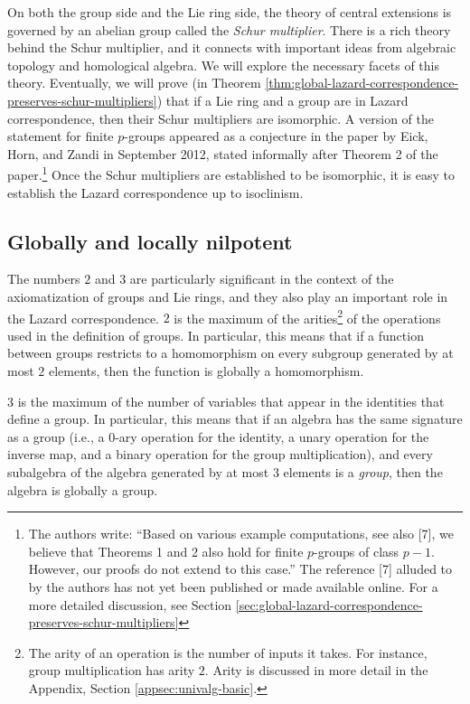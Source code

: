 On both the group side and the Lie ring side, the theory of central
extensions is governed by an abelian group called the {\em Schur
  multiplier}. There is a rich theory behind the Schur multiplier, and
it connects with important ideas from algebraic topology and
homological algebra. We will explore the necessary facets of this
theory. Eventually, we will prove (in Theorem
\ref{thm:global-lazard-correspondence-preserves-schur-multipliers})
that if a Lie ring and a group are in Lazard correspondence, then
their Schur multipliers are isomorphic. A version of the statement for
finite $p$-groups appeared as a conjecture in the paper
\cite{SchurmultiplierandLazard} by Eick, Horn, and Zandi in September
2012, stated informally after Theorem 2 of the paper.\footnote{The
  authors write: ``Based on various example computations, see also
  [7], we believe that Theorems 1 and 2 also hold for finite
  $p$-groups of class $p - 1$. However, our proofs do not extend to
  this case.''  The reference [7] alluded to by the authors has not
  yet been published or made available online. For a more detailed
  discussion, see Section
  \ref{sec:global-lazard-correspondence-preserves-schur-multipliers}}
Once the Schur multipliers are established to be isomorphic, it is
easy to establish the Lazard correspondence up to isoclinism.

\subsection{Globally and locally nilpotent}\label{sec:globally-and-locally-nilpotent}

The numbers $2$ and $3$ are particularly significant in the context of
the axiomatization of groups and Lie rings, and they also play an
important role in the Lazard correspondence. $2$ is the maximum of the
arities\footnote{The arity of an operation is the number of inputs it
  takes. For instance, group multiplication has arity $2$. Arity is
  discussed in more detail in the Appendix, Section
  \ref{appsec:univalg-basic}.} of the operations used in the definition
of groups. In particular, this means that if a function between groups
restricts to a homomorphism on every subgroup generated by at most $2$
elements, then the function is globally a homomorphism.

$3$ is the maximum of the number of variables that appear in the
identities that define a group. In particular, this means that if an
algebra has the same signature as a group (i.e., a $0$-ary operation
for the identity, a unary operation for the inverse map, and a binary
operation for the group multiplication), and every subalgebra of the
algebra generated by at most $3$ elements is a {\em group}, then the
algebra is globally a group.

